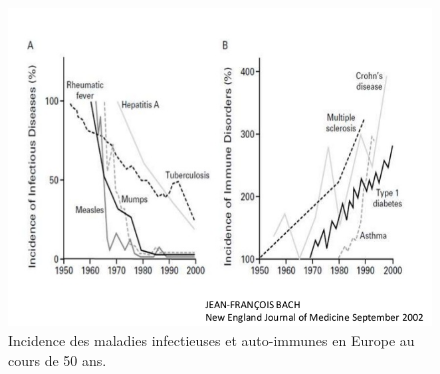 \documentclass[12pt,a4paper]{article}
\begin{document}
\begin{figure}[ht]
\begin{center}
\includegraphics[scale=0.5]{img/allergie_infection.jpg}\hfill
\end{center}
\caption{Incidence des maladies infectieuses et auto-immunes en Europe au cours de 50 ans. }
\label{hyigienisme}
\end{figure}
\end{document}
